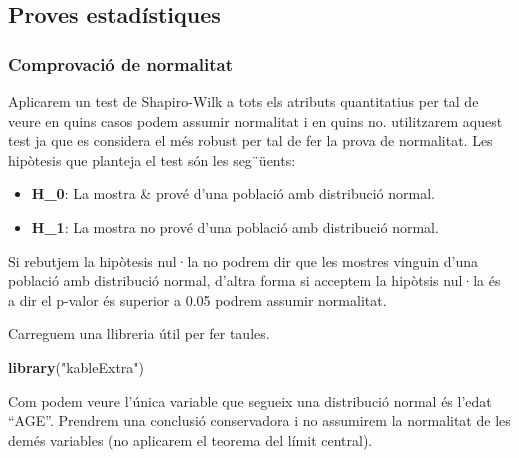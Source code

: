 \documentclass[]{article}
\newenvironment{Shaded}{\begin{snugshade}}{\end{snugshade}}
\newcommand{\KeywordTok}[1]{\textcolor[rgb]{0.13,0.29,0.53}{\textbf{#1}}}
\newcommand{\NormalTok}[1]{#1}
\newcommand{\StringTok}[1]{\textcolor[rgb]{0.31,0.60,0.02}{#1}}
\providecommand{\tightlist}{%
  \setlength{\itemsep}{0pt}\setlength{\parskip}{0pt}}
\begin{document}
\hypertarget{proves-estaduxedstiques}{%
\subsection{Proves estadístiques}\label{proves-estaduxedstiques}}

\hypertarget{comprovaciuxf3-de-normalitat}{%
\subsubsection{Comprovació de
normalitat}\label{comprovaciuxf3-de-normalitat}}

Aplicarem un test de Shapiro-Wilk a tots els atributs quantitatius per
tal de veure en quins casos podem assumir normalitat i en quins no.
utilitzarem aquest test ja que es considera el més robust per tal de fer
la prova de normalitat. Les hipòtesis que planteja el test són les
seg¨üents:

\begin{itemize}
\tightlist
\item
  \textbf{H\_0}: La mostra \& prové d'una població amb distribució
  normal.
\item
  \textbf{H\_1}: La mostra no prové d'una població amb distribució
  normal.
\end{itemize}

Si rebutjem la hipòtesis nul·la no podrem dir que les mostres vinguin
d'una població amb distribució normal, d'altra forma si acceptem la
hipòtsis nul·la és a dir el p-valor és superior a 0.05 podrem assumir
normalitat.

Carreguem una llibreria útil per fer taules.

\begin{Shaded}
\begin{Highlighting}[]
\KeywordTok{library}\NormalTok{(}\StringTok{"kableExtra"}\NormalTok{)}
\end{Highlighting}
\end{Shaded}

Com podem veure l'única variable que segueix una distribució normal és
l'edat ``AGE''. Prendrem una conclusió conservadora i no assumirem la
normalitat de les demés variables (no aplicarem el teorema del límit
central).
\end{document}
